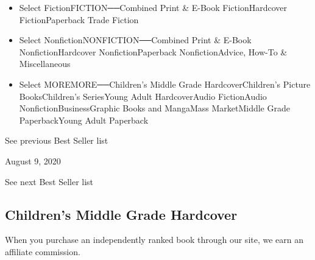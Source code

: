 \begin{itemize}
\tightlist
\item
  Select FictionFICTION──Combined Print \& E-Book FictionHardcover
  FictionPaperback Trade Fiction
\item
  Select NonfictionNONFICTION──Combined Print \& E-Book
  NonfictionHardcover NonfictionPaperback NonfictionAdvice, How-To \&
  Miscellaneous
\item
  Select MOREMORE──Children's Middle Grade HardcoverChildren's Picture
  BooksChildren's SeriesYoung Adult HardcoverAudio FictionAudio
  NonfictionBusinessGraphic Books and MangaMass MarketMiddle Grade
  PaperbackYoung Adult Paperback
\end{itemize}

\href{/books/best-sellers/2020/08/02/childrens-middle-grade-hardcover/}{}

See previous Best Seller list

August 9, 2020

See next Best Seller list

\hypertarget{childrens-middle-grade-hardcover}{%
\subsection{Children's Middle Grade
Hardcover}\label{childrens-middle-grade-hardcover}}

When you purchase an independently ranked book through our site, we earn
an affiliate commission.

